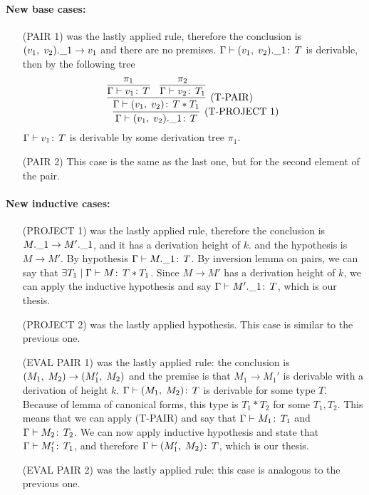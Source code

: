 \paragraph*{New base cases:\\}
\begin{itemize}
\item[(PAIR 1)] was the lastly applied rule, therefore the conclusion
  is \((v_1,\;v_2).\_1 \to v_1\) and there are no
  premises. \(\Gamma \vdash (v_1,\;v_2).\_1 \!:\,T\) is
  derivable, then by the following tree \[\infer[\text{(T-PROJECT
      1)}]{\Gamma \vdash \FST{\PAIR{v_1}{v_2}}
    \TYPE{T}}{\infer[\text{(T-PAIR)}]{\Gamma \vdash \PAIR{v_1}{v_2}
      \TYPE{T * T_1}}{\infer{\Gamma \vdash v_1 \TYPE{T}}{\pi_1} &
      \infer{\Gamma \vdash v_2 \TYPE{T_1}}{\pi_2}}}\] \(\Gamma \vdash
  v_1 \!:\,T\) is derivable by some derivation tree \(\pi_1\).
\item[(PAIR 2)] This case is the same as the last one, but for the
  second element of the pair.
\end{itemize}

\paragraph*{New inductive cases:\\}
\begin{itemize}
\item[(PROJECT 1)] was the lastly applied rule, therefore the
  conclusion is \(M.\_1 \to M'.\_1\), and it has a derivation
  height of $k$. and the hypothesis is \(M\to M'\). By hypothesis
  \(\Gamma \vdash M.\_1 \!:\,T\). By inversion lemma on pairs, we
  can say that \(\exists T_1 \mid \Gamma \vdash M \!:\,T *
    T_1\). Since \(M\to M'\) has a derivation height of \(k\), we can
  apply the inductive hypothesis and say \(\Gamma \vdash M'.\_1
  \!:\,T\), which is our thesis.
\item[(PROJECT 2)] was the lastly applied hypothesis. This case is
  similar to the previous one.
\item[(EVAL PAIR 1)] was the lastly applied rule: the conclusion is
  \((M_1,\;M_2) \to (M_1',\;M_2)\) and the premise is that
  \(M_1 \to M_1'\) is derivable with a derivation of height
  \(k\). \(\Gamma \vdash (M_1,\;M_2) \!:\,T\) is derivable for
  some type \(T\). Because of lemma of canonical forms, this type is
  \(T_1 * T_2\) for some \(T_1, T_2\). This means that we can apply
  (T-PAIR) and say that \(\Gamma \vdash M_1 \!:\,T_1\) and \(\Gamma
  \vdash M_2 \!:\,T_2\). We can now apply inductive hypothesis and
  state that \(\Gamma \vdash M_1' \!:\,T_1\), and therefore \(\Gamma
  \vdash (M_1',\;M_2) \!:\,T\), which is our thesis.
\item[(EVAL PAIR 2)] was the lastly applied rule: this case is
  analogous to the previous one.
\end{itemize}

